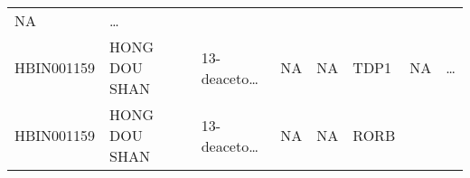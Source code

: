 \documentclass[
]{article}
\begin{document}
\begin{longtable}[]{@{}llllllll@{}}
\begin{minipage}[t]{0.11\columnwidth}
NA\strut
\end{minipage} & \begin{minipage}[t]{0.03\columnwidth}\raggedright
\ldots{}\strut
\end{minipage}\tabularnewline
\begin{minipage}[t]{0.11\columnwidth}\raggedright
HBIN001159\strut
\end{minipage} & \begin{minipage}[t]{0.11\columnwidth}\raggedright
HONG DOU SHAN\strut
\end{minipage} & \begin{minipage}[t]{0.14\columnwidth}\raggedright
13-deaceto\ldots{}\strut
\end{minipage} & \begin{minipage}[t]{0.14\columnwidth}\raggedright
NA\strut
\end{minipage} & \begin{minipage}[t]{0.08\columnwidth}\raggedright
NA\strut
\end{minipage} & \begin{minipage}[t]{0.09\columnwidth}\raggedright
TDP1\strut
\end{minipage} & \begin{minipage}[t]{0.11\columnwidth}\raggedright
NA\strut
\end{minipage} & \begin{minipage}[t]{0.03\columnwidth}\raggedright
\ldots{}\strut
\end{minipage}\tabularnewline
\begin{minipage}[t]{0.11\columnwidth}\raggedright
HBIN001159\strut
\end{minipage} & \begin{minipage}[t]{0.11\columnwidth}\raggedright
HONG DOU SHAN\strut
\end{minipage} & \begin{minipage}[t]{0.14\columnwidth}\raggedright
13-deaceto\ldots{}\strut
\end{minipage} & \begin{minipage}[t]{0.14\columnwidth}\raggedright
NA\strut
\end{minipage} & \begin{minipage}[t]{0.08\columnwidth}\raggedright
NA\strut
\end{minipage} & \begin{minipage}[t]{0.09\columnwidth}\raggedright
RORB\strut
\end{minipage} & \begin{minipage}[t]{0.11\columnwidth}\raggedright

\end{minipage}
\end{longtable}
\end{document}
